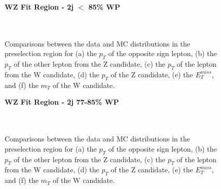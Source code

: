 \begin{figure}[H] 
    \centering
    \textbf{WZ Fit Region - 2j $<$ 85\% WP}\\
    \\
    \\
    \caption{Comparisons between the data and MC distributions in the preselection region for (a) the $p_T$ of the opposite sign lepton, (b) the $p_T$ of the other lepton from the Z candidate, (c) the $p_T$ of the lepton from the W candidate, (d) the $p_T$ of the Z candidate, (e) the $E_T^{miss}$, and (f) the $m_T$ of the W candidate.}
    \label{kin:WP_2j_not85}
\end{figure}

\begin{figure}[H] 
    \centering
    \textbf{WZ Fit Region - 2j 77-85\% WP}\\
    \\
    \\
    \caption{Comparisons between the data and MC distributions in the preselection region for (a) the $p_T$ of the opposite sign lepton, (b) the $p_T$ of the other lepton from the Z candidate, (c) the $p_T$ of the lepton from the W candidate, (d) the $p_T$ of the Z candidate, (e) the $E_T^{miss}$, and (f) the $m_T$ of the W candidate.}
    \label{kin:WP_2j_77_85}
\end{figure}

